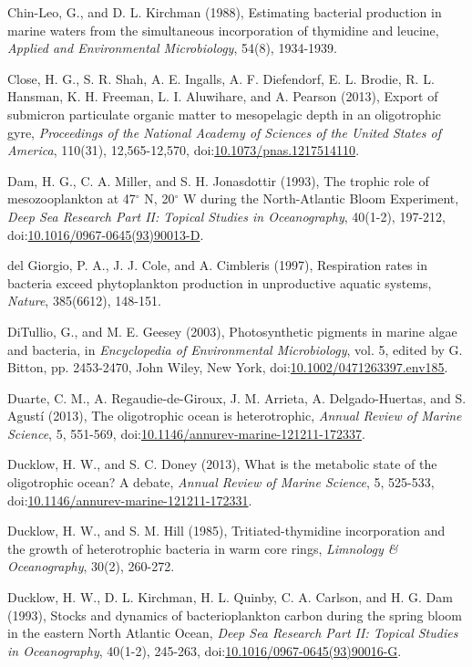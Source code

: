 \begin{singlespace}
{{Chin-Leo, G., and D. L. Kirchman (1988), Estimating bacterial production in marine waters from the simultaneous incorporation of thymidine and leucine, \emph{Applied and Environmental Microbiology}, 54(8), 1934-1939.

Close, H. G., S. R. Shah, A. E. Ingalls, A. F. Diefendorf, E. L. Brodie, R. L. Hansman, K. H. Freeman, L. I. Aluwihare, and A. Pearson (2013), Export of submicron particulate organic matter to mesopelagic depth in an oligotrophic gyre, \emph{Proceedings of the National Academy of Sciences of the United States of America}, 110(31), 12,565-12,570, doi:\href{http://dx.doi.org/10.1073/pnas.1217514110}{10.1073/pnas.1217514110}.
 
Dam, H. G., C. A. Miller, and S. H. Jonasdottir (1993), The trophic role of mesozooplankton at 47$^{\circ}$ N, 20$^{\circ}$ W during the North-Atlantic Bloom Experiment, \emph{Deep Sea Research Part II: Topical Studies in Oceanography}, 40(1-2), 197-212, doi:\href{http://dx.doi.org/10.1016/0967-0645\%2893\%2990013-D}{10.1016/0967-0645(93)90013-D}.

del Giorgio, P. A., J. J. Cole, and A. Cimbleris (1997), Respiration rates in bacteria exceed phytoplankton production in unproductive aquatic systems, \emph{Nature}, 385(6612), 148-151.

DiTullio, G., and M. E. Geesey (2003), Photosynthetic pigments in marine algae and bacteria, in \emph{Encyclopedia of Environmental Microbiology}, vol. 5, edited by G. Bitton, pp. 2453-2470, John Wiley, New York, doi:\href{http://dx.doi.org/10.1002/0471263397.env185}{10.1002/0471263397.env185}.

Duarte, C. M., A. Regaudie-de-Giroux, J. M. Arrieta, A. Delgado-Huertas, and S. Agust\'{i} (2013), The oligotrophic ocean is heterotrophic, \emph{Annual Review of Marine Science}, 5, 551-569, doi:\href{http://dx.doi.org/10.1146/annurev-marine-121211-172337}{10.1146/annurev-marine-121211-172337}.

Ducklow, H. W., and S. C. Doney (2013), What is the metabolic state of the oligotrophic ocean? A debate, \emph{Annual Review of Marine Science}, 5, 525-533, doi:\href{http://dx.doi.org/10.1146/annurev-marine-121211-172331}{10.1146/annurev-marine-121211-172331}.

Ducklow, H. W., and S. M. Hill (1985), Tritiated-thymidine incorporation and the growth of heterotrophic bacteria in warm core rings, \emph{Limnology \& Oceanography}, 30(2), 260-272.

Ducklow, H. W., D. L. Kirchman, H. L. Quinby, C. A. Carlson, and H. G. Dam (1993), Stocks and dynamics of bacterioplankton carbon during the spring bloom in the eastern North Atlantic Ocean, \emph{Deep Sea Research Part II: Topical Studies in Oceanography}, 40(1-2), 245-263, doi:\href{http://dx.doi.org/10.1016/0967-0645\%2893\%2990016-G}{10.1016/0967-0645(93)90016-G}.

}}
\end{singlespace}
